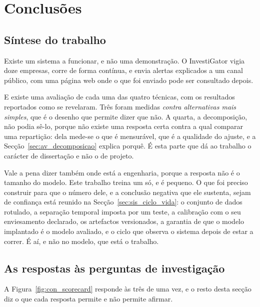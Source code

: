 
\chapter{Conclusões}
\label{cap:conclusoes}

\section{Síntese do trabalho}
\label{sec:con_feito}

Existe um sistema a funcionar, e não uma demonstração. O InvestiGator vigia doze empresas, corre de
forma contínua, e envia alertas explicados a um canal público, com uma página web onde o que
foi enviado pode ser consultado depois.

E existe uma avaliação de cada uma das quatro técnicas, com os resultados reportados como se
revelaram. Três foram medidas \emph{contra alternativas mais simples}, que é o desenho que permite
dizer que não. A quarta, a decomposição, não podia sê-lo, porque não existe uma resposta certa
contra a qual comparar uma repartição: dela mede-se o que é mensurável, que é a qualidade do
ajuste, e a Secção~\ref{sec:av_decomposicao} explica porquê. É esta parte que dá ao trabalho o
carácter de dissertação e não o de projeto.

Vale a pena dizer também onde está a engenharia, porque a resposta não é o tamanho do modelo.
Este trabalho treina um só, e é pequeno. O que foi preciso construir para que o número dele, e
a conclusão negativa que ele sustenta, sejam de confiança está reunido na
Secção~\ref{sec:sis_ciclo_vida}: o conjunto de dados rotulado, a separação temporal imposta por
um teste, a calibração com o seu enviesamento declarado, os artefactos versionados, a garantia
de que o modelo implantado é o modelo avaliado, e o ciclo que observa o sistema depois de estar
a correr. É aí, e não no modelo, que está o trabalho.

\section{As respostas às perguntas de investigação}
\label{sec:con_qi}

A Figura~\ref{fig:con_scorecard} responde às três de uma vez, e o resto desta secção diz o que
cada resposta permite e não permite afirmar.

